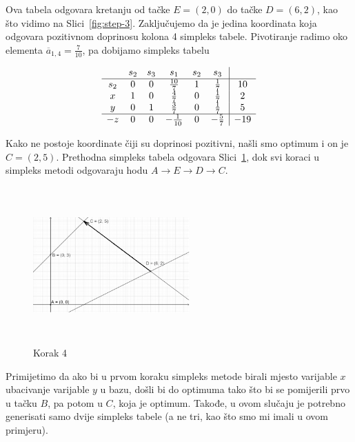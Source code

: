 \documentclass[a4paper, utf8, 11pt, colorlinks]{book}
\begin{document}
Ova tabela odgovara kretanju od tačke $E=(2,0)$ do tačke $D=(6,2)$, kao što vidimo na Slici~\ref{fig:step-3}.
Zaključujemo da je jedina koordinata koja odgovara pozitivnom doprinosu kolona 
4 simpleks tabele. Pivotiranje radimo oko elementa $\overline{a}_{1,4} = \frac{7}{10}$, pa dobijamo simpleks tabelu 

$$\begin{array}{cccccc| c}
	& s_2  & s_3   & s_1  & s_2 & s_3 &     \\ \hline
s_2 &  0   &  0    & \frac{10}{7}    &  1   & \frac{1}{7}   & 10 \\
x   &  1   &  0    &  \frac{4}{7}    &  0   & \frac{1}{7}  & 2 \\
y   &  0   &  1    &  \frac{3}{7}    &  0   & \frac{1}{7}   & 5  \\ \hline
-z  &  0   &  0   &   -\frac{1}{10}  & 0    &  -\frac{5}{7} & -19 \\
\end{array}
$$ 

Kako ne postoje koordinate čiji su doprinosi pozitivni, našli smo optimum i on je   
$C=(2,5)$. Prethodna simpleks tabela odgovara Slici~\ref{fig:step-4}, dok svi koraci u simpleks metodi odgovaraju 
hodu $A \rightarrow E \rightarrow D \rightarrow C$. 

\begin{figure}[H]
	\centering
	\includegraphics[width=170pt, height=170pt]{simpleks-primjer-2-sl4.eps}
	\caption{Korak 4}
	\label{fig:step-4}
\end{figure}


Primijetimo da ako bi u prvom koraku simpleks metode birali mjesto varijable $x$ ubacivanje varijable $y$ u bazu, došli bi do optimuma tako što bi se pomijerili   prvo u tačku $B$, pa potom u $C$, koja je optimum. Takođe, u ovom slučaju je potrebno generisati samo dvije simpleks tabele (a ne tri, kao što smo mi imali u ovom primjeru).\vspace{1cm}
\\
\end{document}
